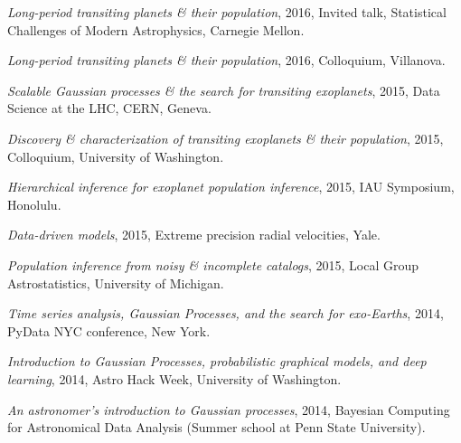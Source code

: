 \documentclass[12pt,letterpaper]{article}
\begin{document}
\begin{list}{}{\cvlist}
  \item \emph{Long-period transiting planets \& their population},
        2016, Invited talk, Statistical Challenges of Modern Astrophysics,
        Carnegie Mellon.

  \item \emph{Long-period transiting planets \& their population}, 2016,
        Colloquium, Villanova.

  \item \emph{Scalable Gaussian processes \& the search for transiting
          exoplanets}, 2015, Data Science at the LHC, CERN, Geneva.

  \item \emph{Discovery \& characterization of transiting exoplanets \& their
          population}, 2015, Colloquium, University of Washington.

  \item \emph{Hierarchical inference for exoplanet population inference},
        2015, IAU Symposium, Honolulu.

  \item \emph{Data-driven models}, 2015, Extreme precision radial velocities,
        Yale.

  \item \emph{Population inference from noisy \& incomplete catalogs}, 2015,
        Local Group Astrostatistics, University of Michigan.

  \item \emph{Time series analysis, Gaussian Processes, and the search for
          exo-Earths},
        2014, PyData NYC conference, New York.

  \item \emph{Introduction to Gaussian Processes, probabilistic graphical
          models, and deep learning},
        2014, Astro Hack Week, University of Washington.

  \item \emph{An astronomer's introduction to Gaussian processes},
        2014, Bayesian Computing for Astronomical Data Analysis (Summer school at
        Penn State University).

\end{list}

\begin{list}{}{\cvlist}
  
\end{list}
\end{document}
